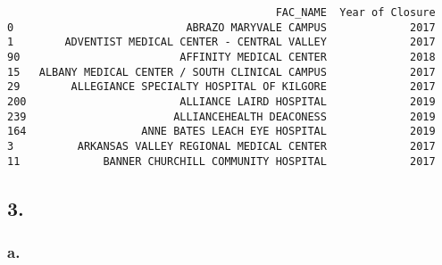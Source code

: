 \documentclass[
  letterpaper,
  DIV=11,
  numbers=noendperiod]{scrartcl}
\begin{document}
\begin{verbatim}
                                          FAC_NAME  Year of Closure
0                           ABRAZO MARYVALE CAMPUS             2017
1        ADVENTIST MEDICAL CENTER - CENTRAL VALLEY             2017
90                         AFFINITY MEDICAL CENTER             2018
15   ALBANY MEDICAL CENTER / SOUTH CLINICAL CAMPUS             2017
29        ALLEGIANCE SPECIALTY HOSPITAL OF KILGORE             2017
200                        ALLIANCE LAIRD HOSPITAL             2019
239                       ALLIANCEHEALTH DEACONESS             2019
164                  ANNE BATES LEACH EYE HOSPITAL             2019
3          ARKANSAS VALLEY REGIONAL MEDICAL CENTER             2017
11             BANNER CHURCHILL COMMUNITY HOSPITAL             2017
\end{verbatim}

\subsection{3.}\label{section-2}

\subsubsection{a.}\label{a.}
\end{document}

